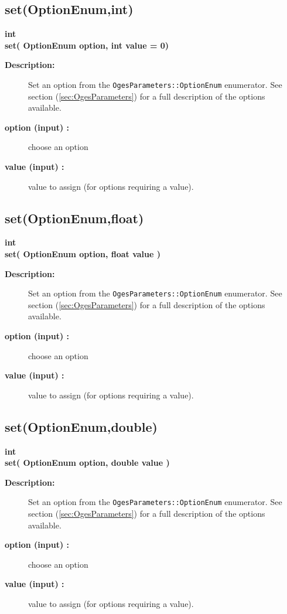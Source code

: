 \subsection{set(OptionEnum,int)}
 
\begin{flushleft} \textbf{%
int  \\ 
\settowidth{\OgesIncludeArgIndent}{set(}%
set(  OptionEnum option, int value  = 0)
}\end{flushleft}
\begin{description}
\item[{\bf Description:}] 
   Set an option from the {\tt OgesParameters::OptionEnum} enumerator.
  See section (\ref{sec:OgesParameters}) for a full description of the options available.
\item[{\bf option (input) :}]  choose an option
\item[{\bf value (input) :}]  value to assign (for options requiring a value).
\end{description}
\subsection{set(OptionEnum,float)}
 
\begin{flushleft} \textbf{%
int  \\ 
\settowidth{\OgesIncludeArgIndent}{set(}%
set(  OptionEnum option, float value )
}\end{flushleft}
\begin{description}
\item[{\bf Description:}] 
   Set an option from the {\tt OgesParameters::OptionEnum} enumerator.
  See section (\ref{sec:OgesParameters}) for a full description of the options available.
\item[{\bf option (input) :}]  choose an option
\item[{\bf value (input) :}]  value to assign (for options requiring a value).
\end{description}
\subsection{set(OptionEnum,double)}
 
\begin{flushleft} \textbf{%
int  \\ 
\settowidth{\OgesIncludeArgIndent}{set(}%
set(  OptionEnum option, double value )
}\end{flushleft}
\begin{description}
\item[{\bf Description:}] 
   Set an option from the {\tt OgesParameters::OptionEnum} enumerator.
  See section (\ref{sec:OgesParameters}) for a full description of the options available.
\item[{\bf option (input) :}]  choose an option
\item[{\bf value (input) :}]  value to assign (for options requiring a value).
\end{description}
